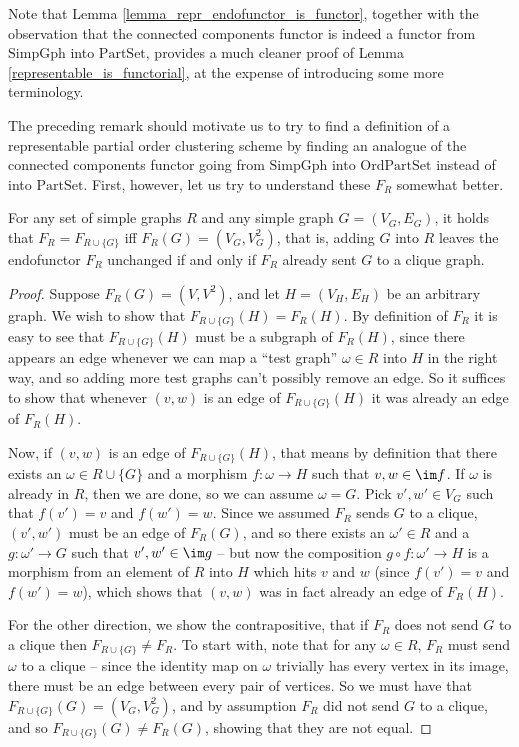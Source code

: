 \documentclass[a4paper,reqno,oneside]{article} %
\begin{document}
\begin{remark}
Note that Lemma \ref{lemma_repr_endofunctor_is_functor}, together with the observation that the connected components functor is indeed a functor from $\mathrm{SimpGph}$ into $\mathrm{PartSet}$, provides a much cleaner proof of Lemma \ref{representable_is_functorial}, at the expense of introducing some more terminology.
\end{remark}

The preceding remark should motivate us to try to find a definition of a representable partial order clustering scheme by finding an analogue of the connected components functor going from $\mathrm{SimpGph}$ into $\mathrm{OrdPartSet}$ instead of into $\mathrm{PartSet}$. First, however, let us try to understand these $F_R$ somewhat better.

\begin{lemma}\label{lemma_hulls_of_representable_endofunctors}
For any set of simple graphs $R$ and any simple graph $G = (V_G,E_G)$, it holds that $F_R = F_{R \cup \{G\}}$ iff $F_R(G) = (V_G, V_G^2)$, that is, adding $G$ into $R$ leaves the endofunctor $F_R$ unchanged if and only if $F_R$ already sent $G$ to a clique graph.

\begin{proof}
Suppose $F_R(G) = (V,V^2)$, and let $H = (V_H, E_H)$ be an arbitrary graph. We wish to show that $F_{R\cup\{G\}}(H) = F_R(H)$. By definition of $F_R$ it is easy to see that $F_{R\cup\{G\}}(H)$ must be a subgraph of $F_R(H)$, since there appears an edge whenever we can map a ``test graph'' $\omega \in R$ into $H$ in the right way, and so adding more test graphs can't possibly remove an edge. So it suffices to show that whenever $(v,w)$ is an edge of $F_{R\cup\{G\}}(H)$ it was already an edge of $F_R(H)$.

Now, if $(v,w)$ is an edge of $F_{R\cup\{G\}}(H)$, that means by definition that there exists an $\omega \in R \cup \{G\}$ and a morphism $f: \omega \to H$ such that $v, w \in \im f$. If $\omega$ is already in $R$, then we are done, so we can assume $\omega = G$. Pick $v', w' \in V_G$ such that $f(v') = v$ and $f(w') = w$. Since we assumed $F_R$ sends $G$ to a clique, $(v', w')$ must be an edge of $F_R(G)$, and so there exists an $\omega' \in R$ and a $g: \omega' \to G$ such that $v', w' \in \im g$ -- but now the composition $g \circ f: \omega' \to H$ is a morphism from an element of $R$ into $H$ which hits $v$ and $w$ (since $f(v') = v$ and $f(w') = w$), which shows that $(v,w)$ was in fact already an edge of $F_R(H)$.

For the other direction, we show the contrapositive, that if $F_R$ does not send $G$ to a clique then $F_{R\cup\{G\}} \neq F_R$. To start with, note that for any $\omega \in R$, $F_R$ must send $\omega$ to a clique -- since the identity map on $\omega$ trivially has every vertex in its image, there must be an edge between every pair of vertices. So we must have that $F_{R\cup\{G\}}(G) = (V_G, V_G^2)$, and by assumption $F_R$ did not send $G$ to a clique, and so $F_{R\cup\{G\}}(G) \neq F_R(G)$, showing that they are not equal.
\end{proof}
\end{lemma}
\end{document}
